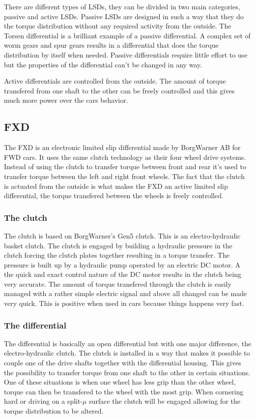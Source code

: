 There are different types of LSDs, they can be divided in two main categories, passive and active LSDs. Passive LSDs are designed in such a way that they do the torque distribution without any required activity from the outside. The Torsen differential is a brilliant example of a passive differential. A complex set of worm gears and spur gears results in a differential that does the torque distribution by itself when needed. Passive differentials require little effort to use but the properties of the differential can't be changed in any way.

Active differentials are controlled from the outside. The amount of torque transfered from one shaft to the other can be freely controlled and this gives much more power over the cars behavior.

\subsection{FXD}
The FXD is an electronic limited slip differential made by BorgWarner AB for FWD cars. It uses the same clutch technology as their four wheel drive systems. Instead of using the clutch to transfer torque between front and rear it's used to transfer torque between the left and right front wheels. The fact that the clutch is actuated from the outside is what makes the FXD an active limited slip differential, the torque transfered between the wheels is freely controlled.

\subsubsection{The clutch}
The clutch is based on BorgWarner's Gen5 clutch. This is an electro-hydraulic basket clutch. The clutch is engaged by building a hydraulic pressure in the clutch forcing the clutch plates together resulting in a torque transfer. The pressure is built up by a hydraulic pump operated by an electric DC motor. A the quick and exact control nature of the DC motor results in the clutch being very accurate. The amount of torque transfered through the clutch is easily managed with a rather simple electric signal and above all changed can be made very quick. This is positive when used in cars because things happens very fast.

\subsubsection{The differential}
The differential is basically an open differential but with one major difference, the electro-hydraulic clutch. The clutch is installed in a way that makes it possible to couple one of the drive shafts together with the differential housing. This gives the possibility to transfer torque from one shaft to the other in certain situations. One of these situations is when one wheel has less grip than the other wheel, torque can then be transfered to the wheel with the most grip. When cornering hard or driving on a split-$ \mu $ surface the clutch will be engaged allowing for the torque distribution to be altered.


